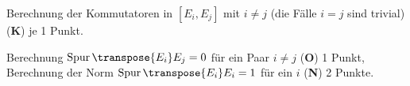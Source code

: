 \begin{bewertung}
\begin{teilaufgaben}
\item
Berechnung der Kommutatoren in $[E_i,E_j]$ mit $i\ne j$ (die Fälle
$i=j$ sind trivial) ({\bf K}) je 1 Punkt.
\item
Berechnung $\operatorname{Spur}\transpose{E_i}E_j=0$ für ein Paar $i\ne j$ ({\bf O})
1 Punkt,
Berechnung der Norm 
$\operatorname{Spur}\transpose{E_i}E_i=1$ für ein $i$ ({\bf N}) 2 Punkte.
\end{teilaufgaben}
\end{bewertung}
